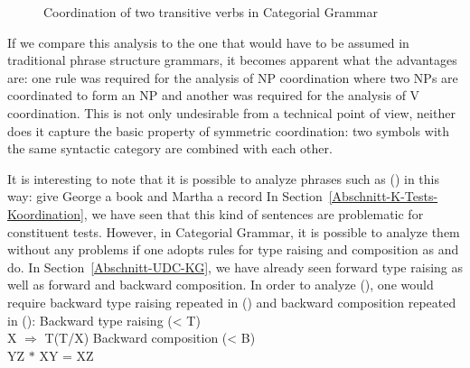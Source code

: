 \begin{exe}
\begin{xlist}[iv.]
\begin{exe}
\begin{xlist}[iv.]
\begin{figure}
\centerline{%
}
\caption{\label{Abb-CG-Koordination-V}Coordination of two transitive verbs in Categorial Grammar}
\end{figure}%

If we compare this analysis to the one that would have to be assumed in traditional phrase structure grammars, it becomes apparent
what the advantages are: one rule was required for the analysis of NP coordination where two NPs are coordinated to form an NP and another was required
for the analysis of V coordination. This is not only undesirable from a technical point of view, neither does it capture the basic property of symmetric coordination:
two symbols with the same syntactic category are combined with each other.

It is interesting to note that it is possible to analyze phrases such as () in this way:
\ea
\label{Beispiel-Gapping-Steedman}
give George a book and Martha a record
\z
In Section~\ref{Abschnitt-K-Tests-Koordination}, we have seen that this kind of sentences are problematic for constituent tests. However, in Categorial Grammar, it is possible to
analyze them without any problems if one adopts rules for type raising and composition as \citet{Dowty88a-u} and \citet{Steedman91a} do.
In Section~\ref{Abschnitt-UDC-KG}, we have already seen forward type raising as well as forward and backward composition. In order to analyze
(), one would require backward type raising repeated in () and backward composition repeated in
():
\ea
Backward type raising (< T)\\
X $\Rightarrow$ T\bs (T/X)
\z
\ea
Backward composition (< B)\\
    Y\bs Z $*$ X\bs Y = X\bs Z
\z


\end{xlist}
\end{exe}
\end{xlist}
\end{exe}
